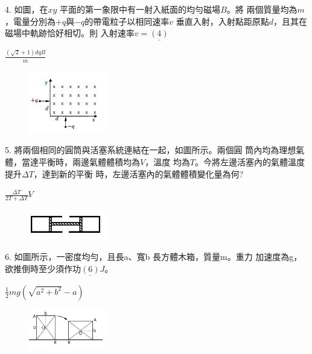 \documentclass[cn,10pt,math=newtx]{elegantbook}
\begin{document}
\begin{example}
   4. 如圖，在$xy$ 平面的第一象限中有一射入紙面的均勻磁場$B$。將
兩個質量均為$m$，電量分別為$+q$與$-q$的帶電粒子以相同速率$v$
垂直入射，入射點距原點$d$，且其在磁場中軌跡恰好相切。則
入射速率$v= \underline{(4)}$ \\
    \rightline{[全國聯招教甄109]}
\end{example}
\begin{solution}
    $\frac{(\sqrt{2}+1) dqB}{m}$
\end{solution}
\begin{figure}[htbp]
    \flushright
    \includegraphics[width=0.3\textwidth]{image/109全國24.png}
  \end{figure}
\newpage



\begin{example}
   5. 將兩個相同的圓筒與活塞系統連結在一起，如圖所示。兩個圓
筒內均為理想氣體，當達平衡時，兩邊氣體體積均為$V$，溫度
均為$T$。今將左邊活塞內的氣體溫度提升$\Delta T$，達到新的平衡
時，左邊活塞內的氣體體積變化量為何?\\
    \rightline{[全國聯招教甄109]}
\end{example}
\begin{solution}
    $\frac{\Delta T}{2T+\Delta T} V$
\end{solution}
\begin{figure}[htbp]
    \flushright
    \includegraphics[width=0.3\textwidth]{image/109全國25.png}
  \end{figure}
\newpage



\begin{example}
   6. 如圖所示，一密度均勻，且長a、寬b 長方體木箱，質量m。重力
加速度為g，欲推倒時至少須作功$\underline{(6)} J$。 \\
    \rightline{[全國聯招教甄109]}
\end{example}
\begin{solution}
    $\frac{1}{2} mg(\sqrt{a^2 +b^2}-a)$
\end{solution}
\begin{figure}[htbp]
    \flushright
    \includegraphics[width=0.3\textwidth]{image/109全國26.png}
  \end{figure}
\newpage
\end{document}
